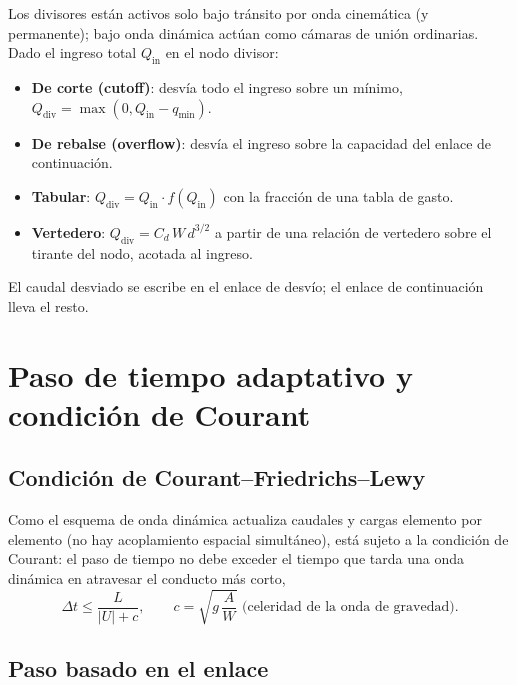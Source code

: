 \documentclass[11pt,a4paper]{article}
\begin{document}
Los divisores están activos solo bajo tránsito por onda cinemática (y
permanente); bajo onda dinámica actúan como cámaras de unión ordinarias. Dado
el ingreso total $Q_{\mathrm{in}}$ en el nodo divisor:
\begin{itemize}[nosep]
  \item \textbf{De corte (cutoff)}: desvía todo el ingreso sobre un mínimo,
        $Q_{\mathrm{div}} = \max(0, Q_{\mathrm{in}} - q_{\min})$.
  \item \textbf{De rebalse (overflow)}: desvía el ingreso sobre la capacidad del
        enlace de continuación.
  \item \textbf{Tabular}: $Q_{\mathrm{div}} = Q_{\mathrm{in}}\cdot
        f(Q_{\mathrm{in}})$ con la fracción de una tabla de gasto.
  \item \textbf{Vertedero}: $Q_{\mathrm{div}} = C_d\,W\,d^{3/2}$ a partir de
        una relación de vertedero sobre el tirante del nodo, acotada al ingreso.
\end{itemize}
El caudal desviado se escribe en el enlace de desvío; el enlace de continuación
lleva el resto.

\section{Paso de tiempo adaptativo y condición de Courant}

\subsection{Condición de Courant--Friedrichs--Lewy}

Como el esquema de onda dinámica actualiza caudales y cargas elemento por
elemento (no hay acoplamiento espacial simultáneo), está sujeto a la condición
de Courant: el paso de tiempo no debe exceder el tiempo que tarda una onda
dinámica en atravesar el conducto más corto,
\begin{equation}
  \Delta t \le \frac{L}{\lvert U \rvert + c},
  \qquad c = \sqrt{g\,\frac{A}{W}}
  \text{ (celeridad de la onda de gravedad).}
\end{equation}

\subsection{Paso basado en el enlace}
\end{document}
